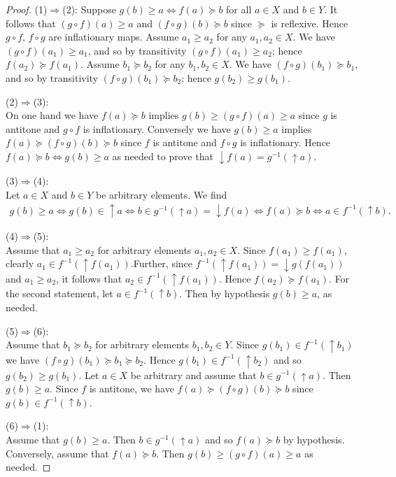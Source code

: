 \documentclass[
  letterpaper,
  10pt,
  reqno,
  twopage,
  openany]{book}
\theoremstyle{plain}
\theoremstyle{definition}
\theoremstyle{definition}
\theoremstyle{definition}
\theoremstyle{plain}
\theoremstyle{plain}
\theoremstyle{remark}
\begin{document}
\begin{proof}

(1)\(\Rightarrow\)(2): Suppose
\({g(b)\geq a \Leftrightarrow f(a)\succeq b}\) for all \(a\in X\) and
\(b\in Y\). It follows that \((g\circ f)(a)\geq a\) and
\((f\circ g)(b)\succeq b\) since \(\succeq\) is reflexive. Hence
\(g\circ f\), \(f\circ g\) are inflationary maps. Assume \(a_1\geq a_2\)
for any \(a_1, a_2\in X\). We have \((g\circ f)(a_1)\geq a_1\), and so
by transitivity \((g\circ f)(a_1)\geq a_2\); hence
\(f(a_2)\succeq f(a_1)\). Assume \(b_1\succeq b_2\) for any
\(b_1, b_2\in X\). We have \((f \circ g)(b_1)\succeq b_1\), and so by
transitivity \((f\circ g)(b_1)\succeq b_2\); hence
\(g(b_2)\geq g(b_1)\).

(2)\(\Rightarrow\)(3):\\
On one hand we have \(f(a)\succeq b\) implies
\({g(b) \geq (g\circ f)(a)\geq a}\) since \(g\) is antitone and
\(g\circ f\) is inflationary. Conversely we have \(g(b)\geq a\) implies
\({f(a)\succeq (f\circ g)(b)\succeq b}\) since \(f\) is antitone and
\(f\circ g\) is inflationary. Hence
\({f(a)\succeq b \Leftrightarrow g(b)\geq a}\) as needed to prove that
\({\downarrow} f(a)=g^{-1}({\uparrow} a)\).

(3)\(\Rightarrow\)(4):\\
Let \(a\in X\) and \(b\in Y\) be arbitrary elements. We find
\begin{align*}
g(b)\geq a \Leftrightarrow g(b)\in {\uparrow} a \Leftrightarrow b\in g^{-1}({\uparrow} a)={\downarrow} f(a) 
\Leftrightarrow f(a)\succeq b \Leftrightarrow a\in f^{-1}({\uparrow} b).
\end{align*}

(4)\(\Rightarrow\)(5):\\
Assume that \(a_1\geq a_2\) for arbitrary elements \(a_1, a_2\in X\).
Since \({f(a_1)\geq f(a_1)}\), clearly
\(a_1\in f^{-1}({\uparrow} f(a_1))\).Further, since
\(f^{-1}({\uparrow} f(a_1))={\downarrow} g(f(a_1))\) and
\(a_1\geq a_2\), it follows that \(a_2\in f^{-1}({\uparrow} f(a_1))\).
Hence \(f(a_2)\succeq f(a_1)\). For the second statement, let
\(a\in f^{-1}({\uparrow} b)\). Then by hypothesis \(g(b)\geq a\), as
needed.

(5)\(\Rightarrow\)(6):\\
Assume that \(b_1\succeq b_2\) for arbitrary elements \(b_1, b_2\in Y\).
Since \({g(b_1)\in f^{-1}({\uparrow} b_1)}\) we have
\((f\circ g)(b_1)\succeq b_1 \succeq b_2\). Hence
\(g(b_1)\in f^{-1}({\uparrow} b_2)\) and so \(g(b_2)\geq g(b_1)\). Let
\(a\in X\) be arbitrary and assume that \(b\in g^{-1}({\uparrow} a)\).
Then \(g(b)\geq a\). Since \(f\) is antitone, we have
\(f(a)\succeq (f\circ g)(b)\succeq b\) since
\(g(b)\in f^{-1}({\uparrow} b)\).

(6)\(\Rightarrow\)(1):\\
Assume that \(g(b)\geq a\). Then \(b\in g^{-1}({\uparrow} a)\) and so
\(f(a)\succeq b\) by hypothesis. Conversely, assume that
\(f(a)\succeq b\). Then \(g(b)\geq (g\circ f)(a)\geq a\) as needed.

\end{proof}
\end{document}
